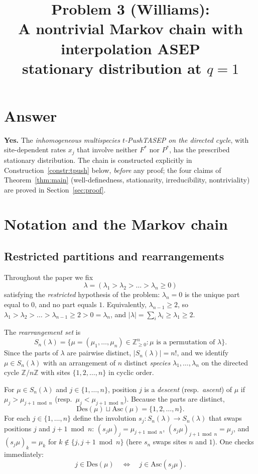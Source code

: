 \documentclass[12pt]{article}
\title{Problem 3 (Williams):\\
A nontrivial Markov chain with interpolation ASEP\\
stationary distribution at $q=1$}
\author{}
\date{}
\theoremstyle{definition}
\begin{document}
\maketitle

\section*{Answer}

\textbf{Yes.} The \emph{inhomogeneous multispecies $t$-PushTASEP on the
directed cycle}, with site-dependent rates $x_j$ that involve neither
$F^*$ nor $P^*$, has the prescribed stationary distribution. The chain
is constructed explicitly in Construction~\ref{constr:tpush} below,
\emph{before} any proof; the four claims of Theorem~\ref{thm:main}
(well-definedness, stationarity, irreducibility, nontriviality) are
proved in Section~\ref{sec:proof}.

\bigskip

\section{Notation and the Markov chain}\label{sec:setup}

\subsection{Restricted partitions and rearrangements}

Throughout the paper we fix
\[
\lambda=(\lambda_1>\lambda_2>\dots>\lambda_n\ge 0)
\]
satisfying the \emph{restricted} hypothesis of the problem: $\lambda_n=0$
is the unique part equal to $0$, and no part equals $1$. Equivalently,
$\lambda_{n-1}\ge 2$, so $\lambda_1>\lambda_2>\dots>\lambda_{n-1}\ge 2>0
=\lambda_n$, and $|\lambda|=\sum_i\lambda_i\ge\lambda_1\ge 2$.

The \emph{rearrangement set} is
\[
S_n(\lambda)=\bigl\{\mu=(\mu_1,\dots,\mu_n)\in\mathbb{Z}_{\ge 0}^n :
\mu\text{ is a permutation of }\lambda\bigr\}.
\]
Since the parts of $\lambda$ are pairwise distinct, $|S_n(\lambda)|=n!$,
and we identify $\mu\in S_n(\lambda)$ with an arrangement of $n$ distinct
\emph{species} $\lambda_1,\dots,\lambda_n$ on the directed cycle
$\mathbb{Z}/n\mathbb{Z}$ with sites $\{1,2,\dots,n\}$ in cyclic order.

For $\mu\in S_n(\lambda)$ and $j\in\{1,\dots,n\}$, position $j$ is a
\emph{descent} (resp.\ \emph{ascent}) of $\mu$ if
$\mu_j>\mu_{j+1\bmod n}$ (resp.\ $\mu_j<\mu_{j+1\bmod n}$). Because the
parts are distinct,
\begin{equation}\label{eq:DesAsc}
\mathrm{Des}(\mu)\sqcup\mathrm{Asc}(\mu)=\{1,2,\dots,n\}.
\end{equation}
For each $j\in\{1,\dots,n\}$ define the involution
$s_j:S_n(\lambda)\to S_n(\lambda)$ that swaps positions $j$ and
$j+1\bmod n$:
$(s_j\mu)_j=\mu_{j+1\bmod n}$, $(s_j\mu)_{j+1\bmod n}=\mu_j$, and
$(s_j\mu)_k=\mu_k$ for $k\notin\{j,j+1\bmod n\}$ (here $s_n$ swaps sites
$n$ and $1$). One checks immediately:
\begin{equation}\label{eq:swap-flip}
j\in\mathrm{Des}(\mu)\quad\Longleftrightarrow\quad
j\in\mathrm{Asc}(s_j\mu).
\end{equation}
\end{document}
